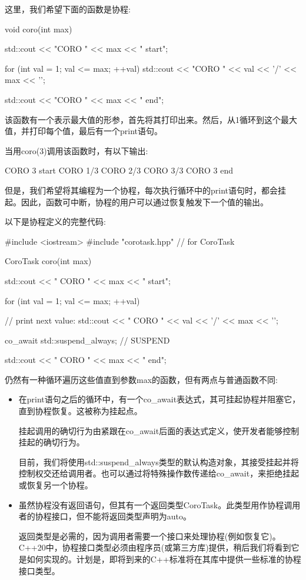 这里，我们希望下面的函数是协程:

\begin{cpp}
void coro(int max)
{
	std::cout << "CORO " << max << " start\n";
	
	for (int val = 1; val <= max; ++val) {
		std::cout << "CORO " << val << '/' << max << '\n';
	}
	
	std::cout << "CORO " << max << " end\n";
}
\end{cpp}

该函数有一个表示最大值的形参，首先将其打印出来。然后，从1循环到这个最大值，并打印每个值，最后有一个print语句。

当用coro(3)调用该函数时，有以下输出:

\begin{shell}
CORO 3 start
CORO 1/3
CORO 2/3
CORO 3/3
CORO 3 end
\end{shell}

但是，我们希望将其编程为一个协程，每次执行循环中的print语句时，都会挂起。因此，函数可中断，协程的用户可以通过恢复触发下一个值的输出。


以下是协程定义的完整代码:


\begin{cpp}
#include <iostream>
#include "corotask.hpp" // for CoroTask

CoroTask coro(int max)
{
	std::cout << "             CORO " << max << " start\n";
	
	for (int val = 1; val <= max; ++val) {
		// print next value:
		std::cout << "          CORO " << val << '/' << max << '\n';
		
		co_await std::suspend_always{}; // SUSPEND
	}
	
	std::cout << " CORO " << max << " end\n";
}
\end{cpp}

仍然有一种循环遍历这些值直到参数max的函数，但有两点与普通函数不同:

\begin{itemize}
\item 
在print语句之后的循环中，有一个co\_await表达式，其可挂起协程并阻塞它，直到协程恢复。这被称为挂起点。

挂起调用的确切行为由紧跟在co\_await后面的表达式定义，使开发者能够控制挂起的确切行为。

目前，我们将使用std::suspend\_always类型的默认构造对象，其接受挂起并将控制权交还给调用者。也可以通过将特殊操作数传递给co\_await，来拒绝挂起或恢复另一个协程。

\item 
虽然协程没有返回语句，但其有一个返回类型CoroTask。此类型用作协程调用者的协程接口，但不能将返回类型声明为auto。

返回类型是必需的，因为调用者需要一个接口来处理协程(例如恢复它)。C++20中，协程接口类型必须由程序员(或第三方库)提供，稍后我们将看到它是如何实现的。计划是，即将到来的C++标准将在其库中提供一些标准的协程接口类型。
\end{itemize}


